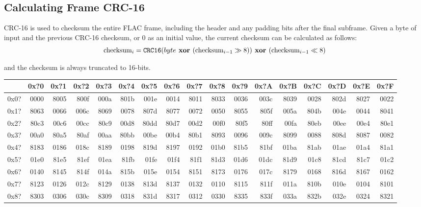 \clearpage

\subsection{Calculating Frame CRC-16}
\label{flac:calculate_crc16}
CRC-16 is used to checksum the entire FLAC frame, including the header
and any padding bits after the final subframe.
Given a byte of input and the previous CRC-16 checksum,
or 0 as an initial value, the current checksum can be calculated as follows:
\begin{equation}
\text{checksum}_i = \texttt{CRC16}(byte\textbf{ xor }(\text{checksum}_{i - 1} \gg 8 ))\textbf{ xor }(\text{checksum}_{i - 1} \ll 8)
\end{equation}
\par
\noindent
and the checksum is always truncated to 16-bits.
\begin{table}[h]
{\ttfamily
\begin{tabular}{|r||r|r|r|r|r|r|r|r|r|r|r|r|r|r|r|r|}
\hline
 & 0x?0 & 0x?1 & 0x?2 & 0x?3 & 0x?4 & 0x?5 & 0x?6 & 0x?7 & 0x?8 & 0x?9 & 0x?A & 0x?B & 0x?C & 0x?D & 0x?E & 0x?F \\
\hline
0x0? & 0000 & 8005 & 800f & 000a & 801b & 001e & 0014 & 8011 & 8033 & 0036 & 003c & 8039 & 0028 & 802d & 8027 & 0022 \\
0x1? & 8063 & 0066 & 006c & 8069 & 0078 & 807d & 8077 & 0072 & 0050 & 8055 & 805f & 005a & 804b & 004e & 0044 & 8041 \\
0x2? & 80c3 & 00c6 & 00cc & 80c9 & 00d8 & 80dd & 80d7 & 00d2 & 00f0 & 80f5 & 80ff & 00fa & 80eb & 00ee & 00e4 & 80e1 \\
0x3? & 00a0 & 80a5 & 80af & 00aa & 80bb & 00be & 00b4 & 80b1 & 8093 & 0096 & 009c & 8099 & 0088 & 808d & 8087 & 0082 \\
0x4? & 8183 & 0186 & 018c & 8189 & 0198 & 819d & 8197 & 0192 & 01b0 & 81b5 & 81bf & 01ba & 81ab & 01ae & 01a4 & 81a1 \\
0x5? & 01e0 & 81e5 & 81ef & 01ea & 81fb & 01fe & 01f4 & 81f1 & 81d3 & 01d6 & 01dc & 81d9 & 01c8 & 81cd & 81c7 & 01c2 \\
0x6? & 0140 & 8145 & 814f & 014a & 815b & 015e & 0154 & 8151 & 8173 & 0176 & 017c & 8179 & 0168 & 816d & 8167 & 0162 \\
0x7? & 8123 & 0126 & 012c & 8129 & 0138 & 813d & 8137 & 0132 & 0110 & 8115 & 811f & 011a & 810b & 010e & 0104 & 8101 \\
0x8? & 8303 & 0306 & 030c & 8309 & 0318 & 831d & 8317 & 0312 & 0330 & 8335 & 833f & 033a & 832b & 032e & 0324 & 8321 \\

\end{tabular}}
\end{table}
